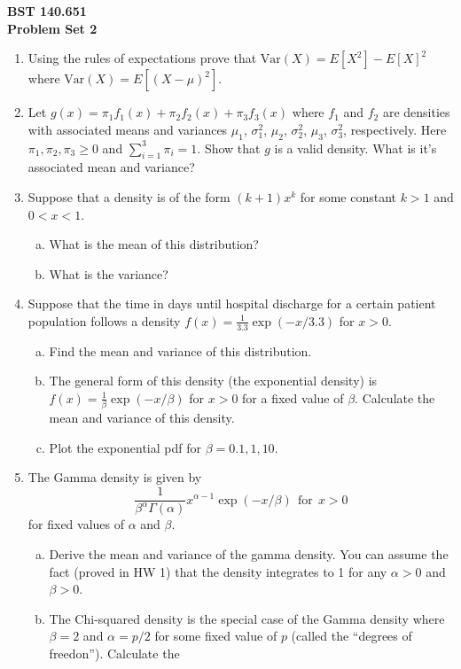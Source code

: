 \documentclass[12pt]{article}
\newcommand{\Var}{\mathrm{Var}}
\begin{document}
\noindent
{\bf BST 140.651 \\ Problem Set 2} \\

\begin{enumerate}[Problem 1.]
\item  Using the rules of expectations prove that $\Var(X) = E[X^2] - E[X]^2$
  where $\Var(X) = E[(X - \mu)^2]$.
\item Let $g(x) = \pi_1 f_1(x) + \pi_2f_2(x)+\pi_3f_3(x)$ where $f_1$ and $f_2$
  are densities with associated means and variances $\mu_1$,
  $\sigma^2_1$, $\mu_2$, $\sigma^2_2$, $\mu_3$, $\sigma^2_3$, respectively. Here $\pi_1,\pi_2,\pi_3\geq 0$ and $\sum_{i=1}^3\pi_i=1$. Show that $g$ is a valid density.
  What is it's associated mean
  and variance?
\item  Suppose that a density is of the form $(k + 1)x^k$ for some constant $k > 1$ and $0 < x < 1$.
  \begin{enumerate}[a.]
  \item What is the mean of this distribution?
  \item What is the variance?
  \end{enumerate}
\item Suppose that the time in days until hospital discharge for a certain patient population
follows a density $f(x) = \frac{1}{3.3}\exp(-x/3.3)$ for $x > 0$.
\begin{enumerate}[a.]
\item Find the mean and variance of this distribution.
\item The general form of this density (the exponential density) is $f(x) = \frac{1}{\beta}\exp(-x/\beta)$ for $x > 0$ for a fixed value of $\beta$. Calculate the mean and variance of this density.
\item Plot the exponential pdf for $\beta=0.1, 1, 10$.
\end{enumerate}
\item The Gamma density is given by
    $$
    \frac{1}{\beta^\alpha\Gamma(\alpha)} x^{\alpha - 1} \exp(-x/\beta) ~~ \mbox{for} ~~ x > 0
    $$
for fixed values of $\alpha$ and $\beta$.
\begin{enumerate}[a.]
\item Derive the mean and variance of the gamma density. You can assume the fact (proved in HW 1) that the density integrates to 1 for any $\alpha > 0$ and $\beta > 0$.
\item The Chi-squared density is the special case of the Gamma density where $\beta = 2$ and
$\alpha = p / 2$ for some fixed value of $p$ (called the ``degrees of freedon''). Calculate the

\end{enumerate}
\end{enumerate}
\end{document}
